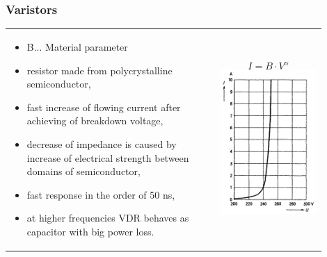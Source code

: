 \documentclass{beamer}
\begin{document}
	\begin{frame}
    \frametitle{Varistors}
		\begin{center}
			\begin{tabular}{m{0.6\linewidth} m{0.3\linewidth}}
			\small
			
			\begin{itemize}
				\item B... Material parameter
				\item resistor made from polycrystalline semiconductor,
				\item fast increase of flowing current after achieving of breakdown voltage,
				\item decrease of impedance is caused by increase of electrical strength between domains of semiconductor,
				\item fast response in the order of 50 ns,
				\item at higher frequencies VDR behaves as capacitor with big power loss.
			\end{itemize} & $$I= B\cdot V^\alpha$$ \includegraphics[scale=0.4]{obr13_vaVaristor.png}
		\end{tabular}
		\end{center}
  \end{frame}
\end{document}
